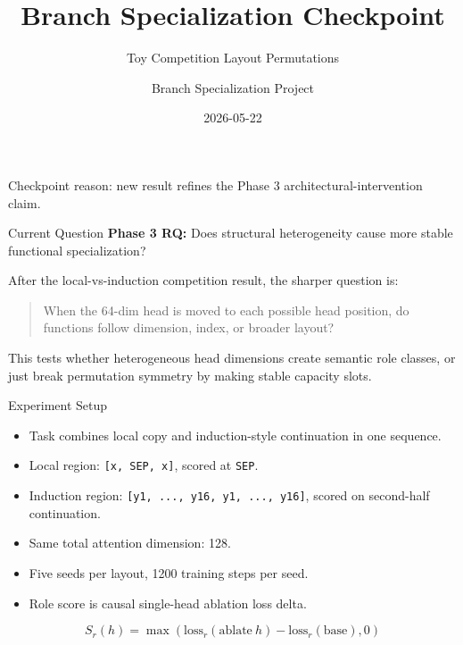 \documentclass[aspectratio=169]{beamer}
\title{Branch Specialization Checkpoint}
\subtitle{Toy Competition Layout Permutations}
\author{Branch Specialization Project}
\date{2026-05-22}
\begin{document}
\begin{frame}
  \titlepage
  \vspace{-0.5em}
  \begin{center}
    Checkpoint reason: new result refines the Phase 3 architectural-intervention claim.
  \end{center}
\end{frame}

\begin{frame}{Current Question}
  \textbf{Phase 3 RQ:} Does structural heterogeneity cause more stable functional specialization?

  \vspace{1em}
  After the local-vs-induction competition result, the sharper question is:

  \vspace{0.5em}
  \begin{quote}
    When the 64-dim head is moved to each possible head position, do functions follow
    dimension, index, or broader layout?
  \end{quote}

  \vspace{0.5em}
  This tests whether heterogeneous head dimensions create semantic role classes, or
  just break permutation symmetry by making stable capacity slots.
\end{frame}

\begin{frame}{Experiment Setup}
  \begin{itemize}
    \item Task combines local copy and induction-style continuation in one sequence.
    \item Local region: \texttt{[x, SEP, x]}, scored at \texttt{SEP}.
    \item Induction region: \texttt{[y1, ..., y16, y1, ..., y16]}, scored on second-half continuation.
    \item Same total attention dimension: 128.
    \item Five seeds per layout, 1200 training steps per seed.
    \item Role score is causal single-head ablation loss delta.
  \end{itemize}

  \vspace{0.5em}
  \[
  S_r(h) = \max(\mathrm{loss}_r(\mathrm{ablate}\ h) - \mathrm{loss}_r(\mathrm{base}), 0)
  \]
\end{frame}
\end{document}
